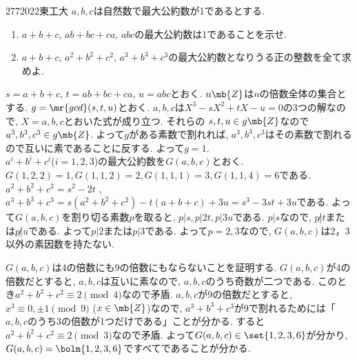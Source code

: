 \begin{prob}{277}{}{2022東工大}
    $a,b,c$は自然数で最大公約数が1であるとする. 
    \begin{enumerate}
    \item $a+b+c$, $ab+bc+ca$, $abc$の最大公約数は1であることを示せ. 
    \item $a+b+c$, $a^2+b^2+c^2$, $a^3+b^3+c^3$の最大公約数となりうる正の整数を全て求めよ.
    \end{enumerate}
\end{prob}
$s=a+b+c$, $t=ab + bc + ca$, $u = abc$とおく. $n\mb{Z}$は$n$の倍数全体の集合とする. 
$g=\mr{gcd}(s,t,u)$とおく. $a,b,c$は$X^3 - sX^2 + tX - u = 0$の3つの解なので, $X=a,b,c$とおいた式が成り立つ. 
それらの $s,t,u\in g\mb{Z}$なので$a^3,b^3,c^3\in g\mb{Z}$. 
よって$g$がある素数で割れれば, $a^3,b^3,c^3$はその素数で割れるので互いに素であることに反する. よって$g=1$.\\  
$a^i+b^i+c^i$($i=1,2,3$)の最大公約数を$G(a,b,c)$とおく. $G(1,2,2) = 1, G(1,1,2) = 2, G(1,1,1) = 3, G(1,1,4) = 6$である. 
$a^2 + b^2 + c^2 = s^2 - 2t$ , $a^3 + b^3 + c^3 = s(a^2 + b^2 + c^2) - t(a+b+c) + 3u = s^3 - 3st  +  3u$である. 
よって$G(a,b,c)$を割り切る素数$p$を取ると, $p|s, p|2t, p|3u$である. $p|s$なので, $p\not | t$または$p\not | u$である.
 よって$p|2$または$p|3$である. よって$p=2,3$なので, $G(a,b,c)$は2，3以外の素因数を持たない. \par
$G(a,b,c)$は4の倍数にも9の倍数にもならないことを証明する. $G(a,b,c)$が4の倍数だとすると, $a,b,c$は互いに素なので, $a,b,c$のうち奇数が二つである.
 このとき$a^2 + b^2 + c^2\equiv 2\pmod{4}$なので矛盾. 
 $a,b,c$が9の倍数だとすると, $x^3 \equiv 0,\pm 1\pmod{9}$ ($x\in \mb{Z}$)なので,
  $a^3 + b^3 + c^3$が9で割れるためには「$a,b,c$のうち3の倍数が1つだけである」ことが分かる. 
  すると$a^2 + b^2 + c^2 \equiv 2\pmod{3}$なので矛盾. よって$G(a,b,c) \in \set{1,2,3,6}$が分かり,
   $G(a,b,c) = \bolm{1,2,3,6}$ですべてであることが分かる. 
